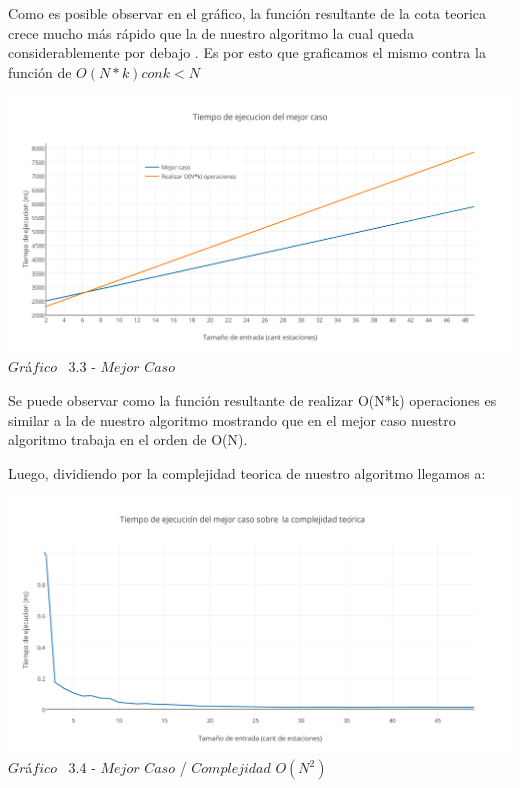 Como es posible observar en el gr\'afico, la funci\'on resultante de la cota teorica crece mucho m\'as r\'apido que la de nuestro algoritmo la cual queda considerablemente por debajo . Es por esto que graficamos el mismo contra la funci\'on de $O(N*k) con k < N$

\vspace*{0.3cm} \vspace*{0.3cm}
  \begin{center}
 \includegraphics[scale=0.65]{./EJ3/mejorcaso1.png}
 {$Gr$\'a$fico$ \ 3.3 - $Mejor$ $Caso$}
  \end{center}
  \vspace*{0.3cm}


Se puede observar como la funci\'on resultante de realizar O(N*k) operaciones es similar a la de nuestro algoritmo mostrando que en el mejor caso nuestro algoritmo trabaja en el orden de O(N).

Luego, dividiendo por la complejidad teorica de nuestro algoritmo llegamos a:\\

\vspace*{0.3cm} \vspace*{0.3cm}
  \begin{center}
\includegraphics[scale=0.65]{./EJ3/mejorcaso2.png}
{$Gr$\'a$fico$ \ 3.4 - $Mejor$ $Caso$ / $Complejidad$ $O(N^2)$}
  \end{center}
  \vspace*{0.3cm}

